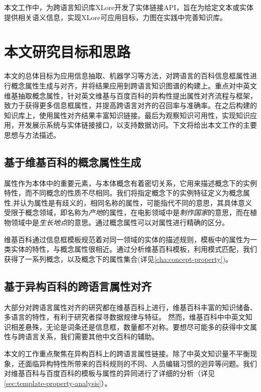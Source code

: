 本文工作中，为跨语言知识库XLore开发了实体链接API，旨在为给定文本或实体提供相关语义信息，实现XLore可应用目标，力图在实践中完善知识库。

\section{本文研究目标和思路}
本文的总体目标为应用信息抽取、机器学习等方法，对跨语言的百科信息框属性进行概念属性生成与对齐，并将结果应用到跨语言知识图谱的构建上。重点对中英文维基抽取概念属性，针对英文维基与百度百科的异构性提出属性对齐流程与框架，致力于获得更多信息框属性，并提高跨语言对齐的召回率与准确率。在之后构建的知识库上，使用属性对齐结果丰富知识链接。最后为观察知识可用性，实现知识应用，开发展示系统与实体链接接口，以支持数据访问。下文将给出本文工作的主要思想与方法描述。

\subsection{基于维基百科的概念属性生成}
属性作为本体中的重要元素，与本体概念有着密切关系，它用来描述概念下的实例特性，而不同概念的性质不尽相同。我们将指定概念下的实例特征定义为概念属性,并认为属性是有歧义的，相同名称的属性，可能指代不同的意思，其具体意义受限于概念领域，即名称为\textit{产地}的属性，在电影领域中是\textit{制作国家}的意思，而在植物领域中是\textit{生长地点}的意思。通过概念属性可以对属性进行精确的区分。

维基百科通过信息框模板规范着对同一领域的实体的描述规则，模板中的属性为一类实体的特性，与概念属性很相近。通过分析维基百科模板，利用模式匹配，我们获得了一系列概念，以及概念下的属性集合(详见\ref{cha:concept-property})。


\subsection{基于异构百科的跨语言属性对齐}
大部分对跨语言属性对齐的研究都在维基百科上进行，维基百科丰富的知识储备、多语言的特性，有利于研究者探寻数据规律与特征。 
然而，维基百科中中英文知识相差悬殊，无论是词条还是信息框，数量都不对称。要想尽可能多的获得中文属性与跨语言关系，我们需要其他中文百科的辅助。

本文的工作重点聚焦在异构百科上的跨语言属性链接。除了中英文知识量不平衡现象，还面临异构特性所带来的百科规则的不同、人员编辑习惯的迥异等问题。我们对维基百科与百度百科的模板与属性的异同进行了详细的分析（详见\ref{sec:template-property-analysis}）。

